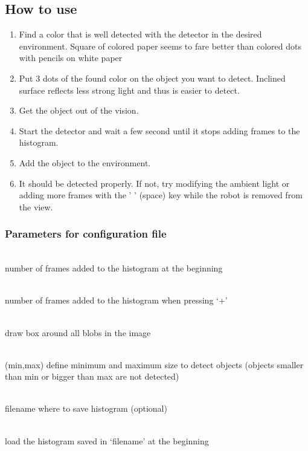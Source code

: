 \subsection{How to use}
\label{sec:ohd:howto}
    \begin{enumerate}
        \item Find a color that is well detected with the detector 
            in the desired environment. Square of colored paper 
            seems to fare better than 
            colored dots with pencils on white paper 
        \item Put 3 dots of the found color on the object you want to 
            detect. Inclined surface reflects less strong light 
            and thus is easier to detect.
        \item Get the object out of the vision.
        \item Start the detector and wait a few second until it stops 
            adding frames to the histogram.
        \item Add the object to the environment. 
        \item It should be detected properly. If not, try modifying the 
            ambient light or adding more frames with the ' ' (space) 
            key while the robot is removed from the view.
    \end{enumerate}

\subsubsection{Parameters for configuration file}
\label{sec:ohd:howto:params}
    \begin{description} \itemindent=-15pt
        \item[examples\_init] \hfill \\ number of frames added to the histogram at the beginning
        \item[examples\_renew] \hfill \\ number of frames added to the histogram when pressing ‘+’
        \item[box] \hfill \\ draw box around all blobs in the image
        \item[area] \hfill \\ (min,max) define minimum and maximum size to detect objects (objects smaller than min or bigger than max are not detected)
        \item[filename] \hfill \\ filename where to save histogram (optional)
        \item[autoload] \hfill \\ load the histogram saved in ‘filename’ at the beginning
    \end{description}

